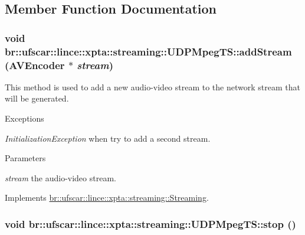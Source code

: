 \subsection{Member Function Documentation}
\hypertarget{classbr_1_1ufscar_1_1lince_1_1xpta_1_1streaming_1_1UDPMpegTS_aee9409fecaba631e3b20358ad4b301fe}{
\subsubsection[{addStream}]{\setlength{\rightskip}{0pt plus 5cm}void br::ufscar::lince::xpta::streaming::UDPMpegTS::addStream ({\bf AVEncoder} $\ast$ {\em stream})}}
\label{classbr_1_1ufscar_1_1lince_1_1xpta_1_1streaming_1_1UDPMpegTS_aee9409fecaba631e3b20358ad4b301fe}


This method is used to add a new audio-\/video stream to the network stream that will be generated. 


\begin{DoxyExceptions}{Exceptions}
\item[{\em InitializationException}]when try to add a second stream. \end{DoxyExceptions}

\begin{DoxyParams}{Parameters}
\item[{\em stream}]the audio-\/video stream. \end{DoxyParams}


Implements \hyperlink{classbr_1_1ufscar_1_1lince_1_1xpta_1_1streaming_1_1Streaming_aec5910b2e3d8c442c16b08ee4717cad5}{br::ufscar::lince::xpta::streaming::Streaming}.

\hypertarget{classbr_1_1ufscar_1_1lince_1_1xpta_1_1streaming_1_1UDPMpegTS_a93e9440df823daca067f260fcbac323f}{
\subsubsection[{stop}]{\setlength{\rightskip}{0pt plus 5cm}void br::ufscar::lince::xpta::streaming::UDPMpegTS::stop ()}}
\label{classbr_1_1ufscar_1_1lince_1_1xpta_1_1streaming_1_1UDPMpegTS_a93e9440df823daca067f260fcbac323f}



